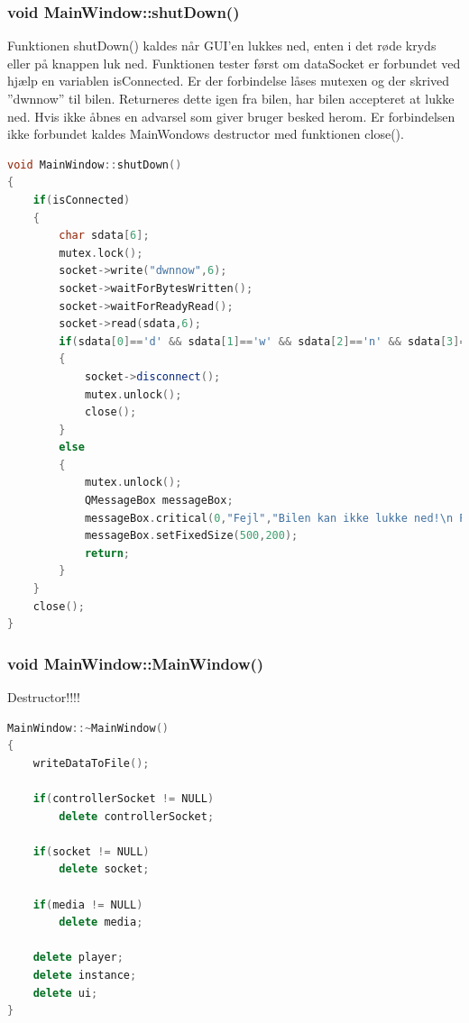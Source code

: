 \subsubsection{void MainWindow::shutDown()}
Funktionen shutDown() kaldes når GUI'en lukkes ned, enten i det røde kryds eller på knappen luk ned. Funktionen tester først om dataSocket er forbundet ved hjælp en variablen isConnected. Er der forbindelse låses mutexen og der skrived ''dwnnow'' til bilen. Returneres dette igen fra bilen, har bilen accepteret at lukke ned. Hvis ikke åbnes en advarsel som giver bruger besked herom. Er forbindelsen ikke forbundet kaldes MainWondows destructor med funktionen close(). 
\begin{lstlisting}[caption={shutDown},label=lst:shutDown, language=c++]
void MainWindow::shutDown()
{
    if(isConnected)
    {
        char sdata[6];
        mutex.lock();
        socket->write("dwnnow",6);
        socket->waitForBytesWritten();
        socket->waitForReadyRead();
        socket->read(sdata,6);
        if(sdata[0]=='d' && sdata[1]=='w' && sdata[2]=='n' && sdata[3]=='n' && sdata[4]=='o' && sdata[5]=='w')
        {
            socket->disconnect();
            mutex.unlock();
            close();
        }
        else
        {
            mutex.unlock();
            QMessageBox messageBox;
            messageBox.critical(0,"Fejl","Bilen kan ikke lukke ned!\n Prøv igen");
            messageBox.setFixedSize(500,200);
            return;
        }
    }
    close();
}
\end{lstlisting}

\subsubsection{void MainWindow::MainWindow()}
Destructor!!!!
\begin{lstlisting}[caption={MainWindow},label=lst:MainWindow, language=c++]
MainWindow::~MainWindow()
{
    writeDataToFile();

    if(controllerSocket != NULL)
        delete controllerSocket;

    if(socket != NULL)
        delete socket;

    if(media != NULL)
        delete media;

    delete player;
    delete instance;
    delete ui;
}
\end{lstlisting}

